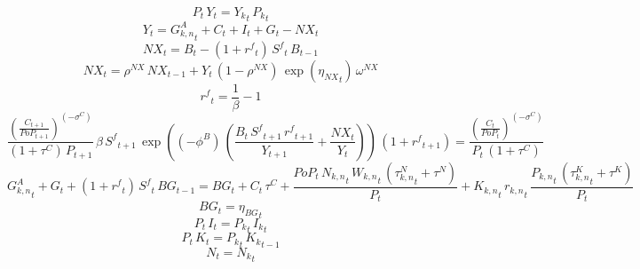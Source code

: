 \begin{dmath}
{P}_{t}\, {Y}_{t}={{Y_k}}_{t}\, {{P_k}}_{t}
\end{dmath}
\begin{dmath}
{Y}_{t}={{G^{A}_{k,n}}}_{t}+{C}_{t}+{I}_{t}+{G}_{t}-{NX}_{t}
\end{dmath}
\begin{dmath}
{NX}_{t}={B}_{t}-\left(1+{{r^{f}}}_{t}\right)\, {S^{f}}_{t}\, {B}_{t-1}
\end{dmath}
\begin{dmath}
{NX}_{t}={{\rho^{NX}}}\, {NX}_{t-1}+{Y}_{t}\, \left(1-{{\rho^{NX}}}\right)\, \exp\left({{\eta_{NX}}}_{t}\right)\, {{\omega^{NX}}}
\end{dmath}
\begin{dmath}
{{r^{f}}}_{t}=\frac{1}{{{\beta}}}-1
\end{dmath}
\begin{dmath}
\frac{\left(\frac{{C}_{t+1}}{{PoP}_{t+1}}\right)^{\left(-{{\sigma^{C}}}\right)}}{\left(1+{{\tau^{C}}}\right)\, {P}_{t+1}}\, {{\beta}}\, {S^{f}}_{t+1}\, \exp\left(\left(-{{\phi^{B}}}\right)\, \left(\frac{{B}_{t}\, {S^{f}}_{t+1}\, {{r^{f}}}_{t+1}}{{Y}_{t+1}}+\frac{{NX}_{t}}{{Y}_{t}}\right)\right)\, \left(1+{{r^{f}}}_{t+1}\right)=\frac{\left(\frac{{C}_{t}}{{PoP}_{t}}\right)^{\left(-{{\sigma^{C}}}\right)}}{{P}_{t}\, \left(1+{{\tau^{C}}}\right)}
\end{dmath}
\begin{dmath}
{{G^{A}_{k,n}}}_{t}+{G}_{t}+\left(1+{{r^{f}}}_{t}\right)\, {S^{f}}_{t}\, {BG}_{t-1}={BG}_{t}+{C}_{t}\, {{\tau^{C}}}+\frac{{PoP}_{t}\, {{N_{k,n}}}_{t}\, {{W_{k,n}}}_{t}\, \left({{\tau^{N}_{k,n}}}_{t}+{{\tau^{N}}}\right)}{{P}_{t}}+{{K_{k,n}}}_{t}\, {{r_{k,n}}}_{t}\, \frac{{{P_{k,n}}}_{t}\, \left({{\tau^{K}_{k,n}}}_{t}+{{\tau^{K}}}\right)}{{P}_{t}}
\end{dmath}
\begin{dmath}
{BG}_{t}={{\eta_{BG}}}_{t}
\end{dmath}
\begin{dmath}
{P}_{t}\, {I}_{t}={{P_k}}_{t}\, {{I_k}}_{t}
\end{dmath}
\begin{dmath}
{P}_{t}\, {K}_{t}={{P_k}}_{t}\, {{K_k}}_{t-1}
\end{dmath}
\begin{dmath}
{N}_{t}={{N_k}}_{t}
\end{dmath}
